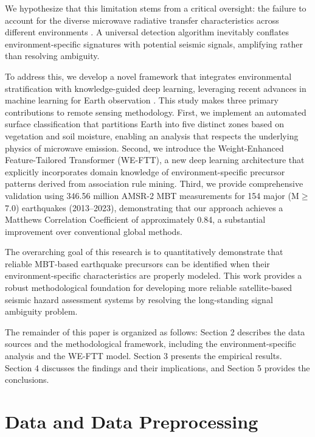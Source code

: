 \documentclass[preprint,review,12pt,authoryear]{elsarticle}
\begin{document}
We hypothesize that this limitation stems from a critical oversight: the failure to account for the diverse microwave radiative transfer characteristics across different environments \citep{njokuRetrievalLandSurface1999,guptaMicrowaveEmissionScattering2014}. A universal detection algorithm inevitably conflates environment-specific signatures with potential seismic signals, amplifying rather than resolving ambiguity. 

To address this, we develop a novel framework that integrates environmental stratification with knowledge-guided deep learning, leveraging recent advances in machine learning for Earth observation \citep{reichsteinDeepLearningEarth2019,zhuDeepLearningRemote2017}. This study makes three primary contributions to remote sensing methodology. First, we implement an automated surface classification that partitions Earth into five distinct zones based on vegetation and soil moisture, enabling an analysis that respects the underlying physics of microwave emission. Second, we introduce the Weight-Enhanced Feature-Tailored Transformer (WE-FTT), a new deep learning architecture that explicitly incorporates domain knowledge of environment-specific precursor patterns derived from association rule mining. Third, we provide comprehensive validation using 346.56 million AMSR-2 MBT measurements for 154 major (M$\ge$7.0) earthquakes (2013--2023), demonstrating that our approach achieves a Matthews Correlation Coefficient of approximately 0.84, a substantial improvement over conventional global methods.

The overarching goal of this research is to quantitatively demonstrate that reliable MBT-based earthquake precursors can be identified when their environment-specific characteristics are properly modeled. This work provides a robust methodological foundation for developing more reliable satellite-based seismic hazard assessment systems by resolving the long-standing signal ambiguity problem.

The remainder of this paper is organized as follows: Section 2 describes the data sources and the methodological framework, including the environment-specific analysis and the WE-FTT model. Section 3 presents the empirical results. Section 4 discusses the findings and their implications, and Section 5 provides the conclusions.

\section{Data and Data Preprocessing}
\end{document}
